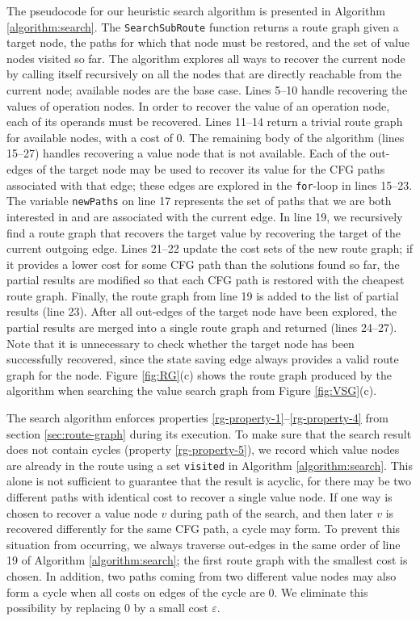 The pseudocode for our heuristic search algorithm is presented in Algorithm \ref{algorithm:search}. 
The {\tt SearchSubRoute} function returns a route graph given a target node, the paths for which that node must be restored, and the set of value nodes visited so far.
The algorithm explores all ways to recover the current node by calling itself recursively on all the nodes that are directly reachable from the current node; available nodes are the base case.
Lines 5--10 handle recovering the values of operation nodes. 
In order to recover the value of an operation node, each of its operands must be recovered.
Lines 11--14 return a trivial route graph for available nodes, with a cost of 0. 
The remaining body of the algorithm (lines 15--27) handles recovering a value node that is not available.
Each of the out-edges of the target node may be used to recover its value for the CFG paths associated with that edge; these edges are explored in the {\tt for}-loop in lines 15--23.
The variable {\tt newPaths} on line 17 represents the set of paths that we are both interested in and are associated with the current edge. 
In line 19, we recursively find a route graph that recovers the target value by recovering the target of the current outgoing edge.
Lines 21--22 update the cost sets of the new route graph; if it provides a lower cost for some CFG path than the solutions found so far, the partial results are modified so that each CFG path is restored with the cheapest route graph.
Finally, the route graph from line 19 is added to the list of partial results (line 23). 
After all out-edges of the target node have been explored, the partial results are merged into a single route graph and returned (lines 24--27).
Note that it is unnecessary to check whether the target node has been successfully recovered, since the state saving edge always provides a valid route graph for the node. 
Figure \ref{fig:RG}(c) shows the route graph produced by the algorithm when searching the value search graph from Figure \ref{fig:VSG}(c).

The search algorithm enforces properties \ref{rg-property-1}--\ref{rg-property-4} from section \ref{sec:route-graph} during its execution.
To make sure that the search result does not contain cycles (property \ref{rg-property-5}), we record which value nodes are already in the route using a set \texttt{visited} in Algorithm \ref{algorithm:search}. 
This alone is not sufficient to guarantee that the result is acyclic, for there may be two different paths with identical cost to recover a single value node. 
If one way is chosen to recover a value node $v$ during path of the search, and then later $v$ is recovered differently for the same CFG path, a cycle may form.
To prevent this situation from occurring, we always traverse out-edges in the same order of line 19 of Algorithm \ref{algorithm:search}; the first route graph with the smallest cost is chosen. In addition, two paths coming from two different value nodes may also form a cycle when all costs on edges of the cycle are 0. We eliminate this possibility by replacing 0 by a small cost $\varepsilon$.

